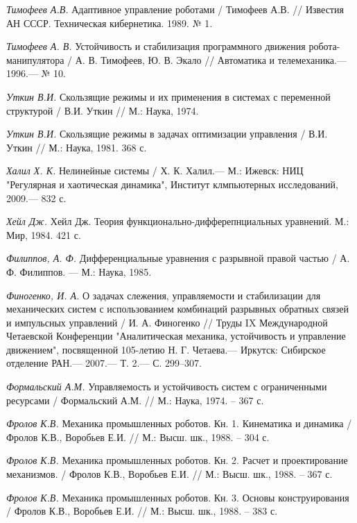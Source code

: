 \begin{thebibliography}{10}
	{\it Тимофеев А.В.} Адаптивное управление роботами / Тимофеев А.В. // Известия АН СССР. Техническая кибернетика. 1989. № 1.
	
	{\it Тимофеев А. В.} Устойчивость и стабилизация программного движения робота-манипулятора /
	А. В. Тимофеев, Ю. В. Экало // Автоматика и телемеханика.— 1996.— № 10.
	
	{\it Уткин В.И.} Скользящие режимы и их применения в системах с переменной структурой / В.И. Уткин // М.: Наука, 1974.
	
	{\it Уткин В.И.} Скользящие режимы в задачах оптимизации управления / В.И. Уткин // М.: Наука, 1981. 368 с.
	
	{\it Халил Х. К.} Нелинейные системы / Х. К. Халил.— М.: Ижевск: НИЦ "Регулярная и хаотическая динамика", Институт клмпьютерных исследований, 		2009.— 832 с.
	
	{\it Хейл Дж.} Хейл Дж. Теория функционально-дифферепнциальных уравнений. М.: Мир,
	1984. 421 с.
	
	{\it Филиппов, А. Ф.} Дифференциальные уравнения с разрывной правой частью /
	А. Ф. Филиппов. — М.: Наука, 1985.
	
	{\it Финогенко, И. А.} О задачах слежения, управляемости и стабилизации для механических систем с использованием комбинаций разрывных обратных 		связей и импульсных управлений / И. А. Финогенко // Труды IX Международной Четаевской Конференции "Аналитическая механика, устойчивость и 		управление движением", посвященной 105-летию Н. Г. Четаева.— Иркутск: Сибирское отделение РАН.— 2007.— Т. 2.— С. 299–307.
	
	{\it Формальский А.М.} Управляемость и устойчивость систем с ограниченными ресурсами / Формальский А.М. // М.: Наука, 1974. – 367 с.
	
	{\it Фролов К.В.} Механика промышленных роботов. Кн. 1. Кинематика и динамика / Фролов К.В., Воробьев Е.И. // М.: Высш. шк., 1988. – 304 с.
	
	{\it Фролов К.В.} Механика промышленных роботов. Кн. 2. Расчет и проектирование механизмов. / Фролов К.В., Воробьев Е.И. // М.: Высш. шк., 1988. 	– 367 с.
	
	{\it Фролов К.В.} Механика промышленных роботов. Кн. 3. Основы конструирования / Фролов К.В., Воробьев Е.И. // М.: Высш. шк., 1988. – 383 с.
	

\end{thebibliography}
